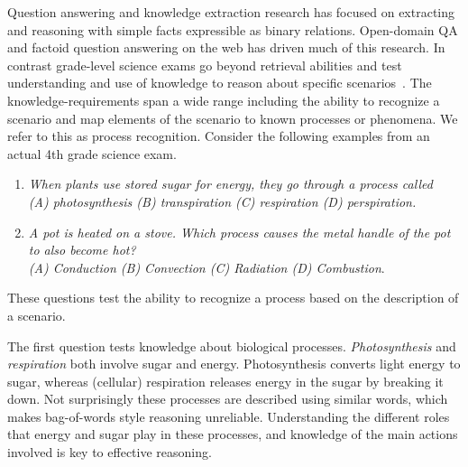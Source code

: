 
Question answering and knowledge extraction research has focused on extracting and reasoning with simple facts expressible as binary relations.
Open-domain QA and factoid question answering on the web has driven much of this research. 
In contrast grade-level science exams go beyond retrieval abilities and test understanding and use of knowledge to reason about specific scenarios~\cite{clark2014:akbc}.
The knowledge-requirements span a wide range including the ability to recognize a scenario and map elements of the scenario to known processes or phenomena. We refer to this as process recognition. Consider the following examples from an actual 4th grade science exam.

\begin{enumerate}
\item {\em When plants use stored sugar for energy, they go through a process called \\
(A) photosynthesis (B) transpiration (C) respiration (D) perspiration.}
\item {\em A pot is heated on a stove. Which process causes the metal handle of the pot to also become hot? \\
(A) Conduction (B) Convection (C) Radiation (D) Combustion}. \\
\end{enumerate}

These questions test the ability to recognize a process based on the description of a scenario. 

The first question tests knowledge about biological processes.
{\em Photosynthesis} and {\em respiration} both involve sugar and energy. 
Photosynthesis converts light energy to sugar, whereas (cellular) respiration releases energy in the sugar by breaking it down. 
Not surprisingly these processes are described using similar words, which makes bag-of-words style reasoning unreliable. 
Understanding the different roles that energy and sugar play in these processes, and knowledge of the main actions involved is key to effective reasoning.

